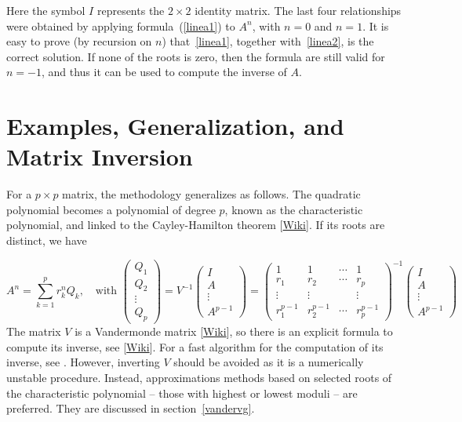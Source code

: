 \documentclass[oneside,10pt]{book}
\begin{document}
Here the symbol $I$ represents the $2 \times 2$ identity matrix. The last four relationships were obtained by applying formula~(\ref{linea1}) to $A^n$, with $n = 0$ and $n = 1$.
It is easy to prove (by recursion on $n$) that~\ref{linea1}, together with~\ref{linea2}, is the correct solution. If none of the roots is zero, then the formula are still valid for $n = -1$, and thus it can be used to compute the inverse of $A$.

\section{Examples, Generalization, and Matrix Inversion}\label{slin1}

For a $p \times p$ matrix, the methodology generalizes as follows. The quadratic polynomial becomes a polynomial of degree $p$, known as the
\textcolor{index}{characteristic polynomial}, and linked to the \textcolor{index}{Cayley-Hamilton theorem} [\href{https://en.wikipedia.org/wiki/Cayley\%E2\%80\%93Hamilton_theorem}{Wiki}]. If its roots are distinct, we have

\begin{equation}\label{linea11}
A^n=\sum_{k=1}^p r_k^n Q_k, \quad\text{with } \left(
\begin{aligned}
      Q_1\\
     Q_2 \\
     \vdots \\
    Q_p
\end{aligned}
\right) = V^{-1} \left(
\begin{array}{c}
      I \\
     A \\
     \vdots \\
    A^{p-1}
\end{array}
\right)  =\left(
\begin{array}{cccc}
      1 & 1 & \cdots & 1 \\
     r_1 & r_2 & \cdots & r_p \\
     \vdots & \vdots &  & \vdots \\
    r_1^{p-1} &  r_2^{p-1} &\cdots  &  r_p^{p-1}
\end{array}
\right)^{-1} \left(
\begin{array}{c}
      I \\
     A \\
     \vdots \\
    A^{p-1}
\end{array}
\right)
\end{equation}
The matrix $V$ is a \textcolor{index}{Vandermonde matrix} [\href{https://en.wikipedia.org/wiki/Vandermonde_matrix}{Wiki}], so there is an explicit formula to compute its inverse,
see [\href{https://proofwiki.org/wiki/Inverse_of_Vandermonde_Matrix}{Wiki}].
For a fast algorithm for the computation of its inverse, see \cite{ieeevander}. However, inverting $V$ should be avoided as it is
a \textcolor{index}{numerically unstable} procedure. Instead, approximations methods based on selected roots of the characteristic polynomial -- those with  highest or lowest moduli -- are preferred. They are discussed in section~\ref{vandervg}.
\end{document}
